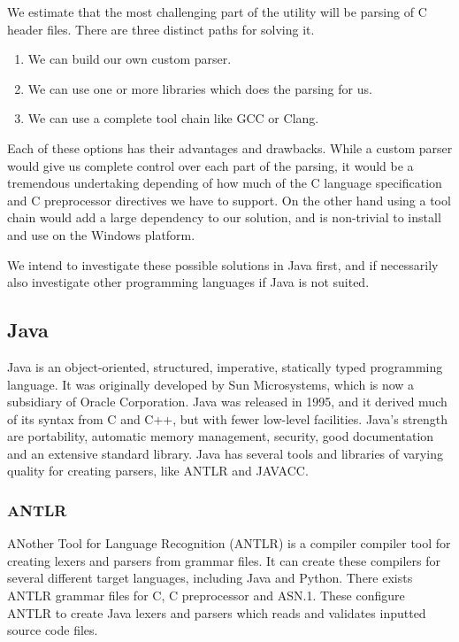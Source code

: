 We estimate that the most challenging part of the utility will be parsing of C
header files. There are three distinct paths for solving it.
\begin{enumerate}
	\item We can build our own custom parser.
	\item We can use one or more libraries which does the parsing for us.
	\item We can use a complete tool chain like GCC or Clang.
\end{enumerate}

\noindent Each of these options has their advantages and drawbacks. While a
custom parser would give us complete control over each part of the parsing, it
would be a tremendous undertaking depending of how much of the C language
specification and C preprocessor directives we have to support. On the other
hand using a tool chain would add a large dependency to our solution, and is
non-trivial to install and use on the Windows platform.

We intend to investigate these possible solutions in Java first, and if
necessarily also investigate other programming languages if Java is not suited.

\subsection{Java}
Java is an object-oriented, structured, imperative, statically typed
programming language. It was originally developed by Sun Microsystems, which
is now a subsidiary of Oracle Corporation. Java was released in 1995, and it
derived much of its syntax from C and C++, but with fewer low-level facilities.
Java’s strength are portability, automatic memory management, security, good
documentation and an extensive standard library. Java has several tools and
libraries of varying quality for creating parsers, like ANTLR and JAVACC.

\subsubsection{ANTLR}
ANother Tool for Language Recognition (ANTLR) is a compiler compiler tool for
creating lexers and parsers from grammar files. It can create these compilers
for several different target languages, including Java and Python. There exists
ANTLR grammar files for C, C preprocessor and ASN.1. These configure ANTLR to
create Java lexers and parsers which reads and validates inputted source code
files.

